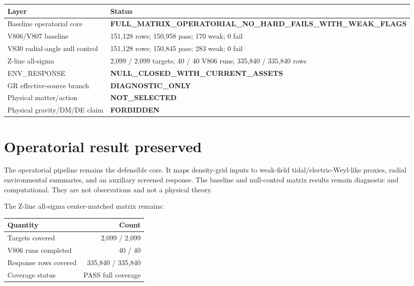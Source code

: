 \documentclass[11pt,a4paper]{article}
\newcommand{\status}[1]{\textsf{\textbf{#1}}}
\begin{document}
\begin{center}
\begin{tabular}{ll}
\toprule
Layer & Status \\
\midrule
Baseline operatorial core & \status{FULL\_MATRIX\_OPERATORIAL\_NO\_HARD\_FAILS\_WITH\_WEAK\_FLAGS} \\
V806/V807 baseline & 151,128 rows; 150,958 pass; 170 weak; 0 fail \\
V830 radial-angle null control & 151,128 rows; 150,845 pass; 283 weak; 0 fail \\
Z-line all-sigma & 2,099 / 2,099 targets; 40 / 40 V806 runs; 335,840 / 335,840 rows \\
ENV\_RESPONSE & \status{NULL\_CLOSED\_WITH\_CURRENT\_ASSETS} \\
GR effective-source branch & \status{DIAGNOSTIC\_ONLY} \\
Physical matter/action & \status{NOT\_SELECTED} \\
Physical gravity/DM/DE claim & \status{FORBIDDEN} \\
\bottomrule
\end{tabular}
\end{center}

\section{Operatorial result preserved}

The operatorial pipeline remains the defensible core. It maps density-grid inputs to weak-field tidal/electric-Weyl-like proxies, radial environmental summaries, and an auxiliary screened response. The baseline and null-control matrix results remain diagnostic and computational. They are not observations and not a physical theory.

The Z-line all-sigma center-matched matrix remains:

\begin{center}
\begin{tabular}{lr}
\toprule
Quantity & Count \\
\midrule
Targets covered & 2,099 / 2,099 \\
V806 runs completed & 40 / 40 \\
Response rows covered & 335,840 / 335,840 \\
Coverage status & PASS full coverage \\
\bottomrule
\end{tabular}
\end{center}
\end{document}
